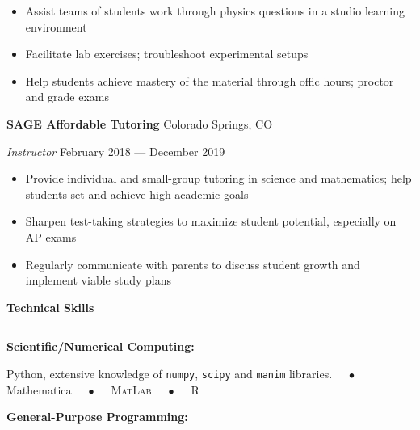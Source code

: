 \documentclass{article}
\numberwithin{equation}{section}
\begin{document}
\vspace{-0.5em}

\begin{itemize}[leftmargin=6.0em]
\setlength{\itemsep}{0em}
\item Assist teams of students work through physics questions in a studio learning environment
\item Facilitate lab exercises; troubleshoot experimental setups
\item Help students achieve mastery of the material through offic hours; proctor and grade exams
\end{itemize}

\hspace{1.5em} \textbf{SAGE Affordable Tutoring} \hfill Colorado Springs, CO

\hspace{1.5em} \textit{Instructor} \hfill February 2018 --- December 2019

\vspace{-0.5em}

\begin{itemize}[leftmargin=6.0em]
\setlength{\itemsep}{0em}
\item Provide individual and small-group tutoring in science and mathematics; help students set and achieve high academic goals
\item Sharpen test-taking strategies to maximize student potential, especially on AP exams
\item Regularly communicate with parents to discuss student growth and implement viable study plans
\end{itemize}

\vspace{1em}

\textbf{\Large{Technical Skills}} \\[-0.5em]
\rule{\textwidth}{1pt}

\hspace{1.5em} \textbf{Scientific/Numerical Computing:}

\hspace{3.0em} Python, extensive knowledge of \texttt{numpy}, \texttt{scipy} and \texttt{manim} libraries. $\quad\bullet\quad$ Mathematica $\quad\bullet\quad$ \textsc{MatLab} $\quad\bullet\quad$ R

\vspace{0.5em}

\hspace{1.5em} \textbf{General-Purpose Programming:}
\end{document}
